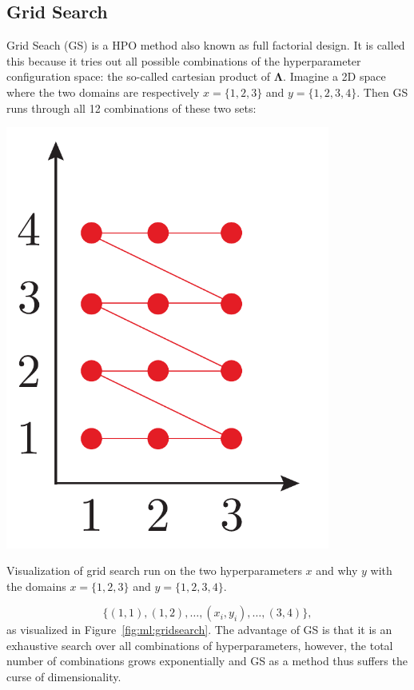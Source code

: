 \subsection{Grid Search}
\label{subsec:ml:grid_search}

Grid Seach (GS) is a HPO method also known as full factorial design. It is called this because it tries out all possible combinations of the hyperparameter configuration space: the so-called cartesian product of $\bm{\Lambda}$. Imagine a 2D space where the two domains are respectively $x=\{1, 2, 3\}$ and $y=\{1, 2, 3,4\}$. Then GS runs through all \num{12} combinations of these two sets: 

\begin{marginfigure}
  \includegraphics[width=0.8\textwidth]{figures/gridsearch/grid.pdf}
  \caption[Grid Search]{Visualization of grid search run on the two hyperparameters $x$ and why $y$ with the domains $x=\{1, 2, 3\}$ and $y=\{1, 2, 3,4\}$.}
  \label{fig:ml:gridsearch}
\end{marginfigure}

\begin{equation}
  \{(1, 1), (1, 2), \dots, (x_i, y_i), \dots, (3, 4)\},
\end{equation}
as visualized in Figure~\ref{fig:ml:gridsearch}. The advantage of GS is that it is an exhaustive search over all combinations of hyperparameters, however, the total number of combinations grows exponentially and GS as a method thus suffers the curse of dimensionality.



